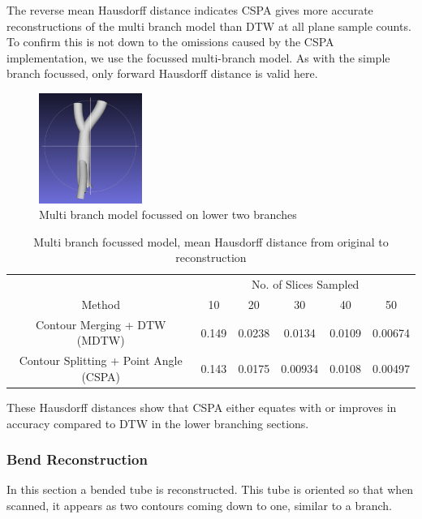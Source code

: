 \documentclass[11p, titlepage]{article}
\begin{document}
The reverse mean Hausdorff distance indicates CSPA gives more accurate reconstructions of the multi branch model than DTW at all plane sample counts. To confirm this is not down to the omissions caused by the CSPA implementation, we use the focussed multi-branch model. As with the simple branch focussed, only forward Hausdorff distance is valid here.

\begin{figure}[h!]
\centering
\includegraphics[width=0.3\textwidth]{originals/multi-branch-2-7}
\caption{Multi branch model focussed on lower two branches\label{fig:multi_branch_focussed}}
\end{figure}

\begin{table}[h!]
\begin{tabular}{ | c | c | c | c | c | c | }
\hline
& \multicolumn{5}{c|}{No. of Slices Sampled} \\
\cline{2-6}
Method & 10 & 20 & 30 & 40 & 50 \\
\hline
Contour Merging + DTW (MDTW) & 0.149 & 0.0238 & 0.0134 & 0.0109 & 0.00674 \\
Contour Splitting + Point Angle (CSPA) & 0.143 & 0.0175 & 0.00934 & 0.0108 & 0.00497 \\
\hline
\end{tabular}
\caption{Multi branch focussed model, mean Hausdorff distance from original to reconstruction}
\label{table:multi_branch_focussed_forward}
\end{table}
\FloatBarrier

These Hausdorff distances show that CSPA either equates with or improves in accuracy compared to DTW in the lower branching sections.
\pagebreak

\subsubsection{Bend Reconstruction}

In this section a bended tube is reconstructed. This tube is oriented so that when scanned, it appears as two contours coming down to one, similar to a branch.
\end{document}
